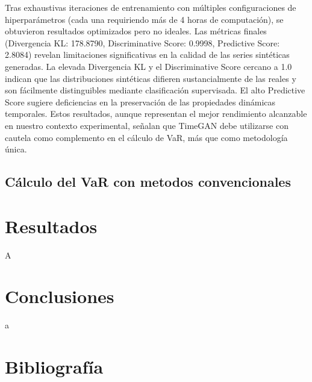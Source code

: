 \documentclass{article}
\theoremstyle{definition}
\theoremstyle{remark}
\begin{document}
Tras exhaustivas iteraciones de entrenamiento con múltiples configuraciones de hiperparámetros (cada una requiriendo más de 4 horas de computación), se obtuvieron resultados optimizados pero no ideales. Las métricas finales (Divergencia KL: 178.8790, Discriminative Score: 0.9998, Predictive Score: 2.8084) revelan limitaciones significativas en la calidad de las series sintéticas generadas. La elevada Divergencia KL y el Discriminative Score cercano a 1.0 indican que las distribuciones sintéticas difieren sustancialmente de las reales y son fácilmente distinguibles mediante clasificación supervisada. El alto Predictive Score sugiere deficiencias en la preservación de las propiedades dinámicas temporales. Estos resultados, aunque representan el mejor rendimiento alcanzable en nuestro contexto experimental, señalan que TimeGAN debe utilizarse con cautela como complemento en el cálculo de VaR, más que como metodología única.

\subsection{Cálculo del VaR con metodos convencionales}

\section{Resultados}
A

\section{Conclusiones}
a

\section{Bibliografía}

\nocite{yoon2019timegan}
\nocite{yoon2019timegan_repo}
\nocite{gusxo2021timegan_keras}

\printbibliography[heading=none]
\end{document}
